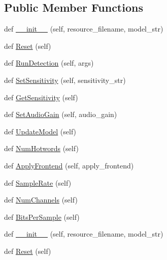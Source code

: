 \subsection*{Public Member Functions}
\begin{DoxyCompactItemize}
\item 
def \hyperlink{classsnowboydetect_1_1SnowboyDetect_aacebc037562e278d600502c85a6e6240}{\+\_\+\+\_\+init\+\_\+\+\_\+} (self, resource\+\_\+filename, model\+\_\+str)
\item 
def \hyperlink{classsnowboydetect_1_1SnowboyDetect_a721badd1050cbad9ecb3734610f5fec7}{Reset} (self)
\item 
def \hyperlink{classsnowboydetect_1_1SnowboyDetect_aa81c3446d9f86cdc82afe896b7503f92}{Run\+Detection} (self, args)
\item 
def \hyperlink{classsnowboydetect_1_1SnowboyDetect_a31672fe0859a72050c7e143c58c218c7}{Set\+Sensitivity} (self, sensitivity\+\_\+str)
\item 
def \hyperlink{classsnowboydetect_1_1SnowboyDetect_a836549077589837b8e94f563f3f9ff03}{Get\+Sensitivity} (self)
\item 
def \hyperlink{classsnowboydetect_1_1SnowboyDetect_acfa7c3d929aa0a1400a85f4c85883830}{Set\+Audio\+Gain} (self, audio\+\_\+gain)
\item 
def \hyperlink{classsnowboydetect_1_1SnowboyDetect_a5fe893dcbae408d4419b33b8f1c7db5a}{Update\+Model} (self)
\item 
def \hyperlink{classsnowboydetect_1_1SnowboyDetect_a281b6281e98d035872f289a4d31041dd}{Num\+Hotwords} (self)
\item 
def \hyperlink{classsnowboydetect_1_1SnowboyDetect_a4b4e6740fe532680390a8dcf3501a64a}{Apply\+Frontend} (self, apply\+\_\+frontend)
\item 
def \hyperlink{classsnowboydetect_1_1SnowboyDetect_aa4a6097517da1f8ba4fab8041e0748b8}{Sample\+Rate} (self)
\item 
def \hyperlink{classsnowboydetect_1_1SnowboyDetect_a46d9f2d6be050a727731557d7865ec96}{Num\+Channels} (self)
\item 
def \hyperlink{classsnowboydetect_1_1SnowboyDetect_a0281b47c8358e32c8aa464213b0dba97}{Bits\+Per\+Sample} (self)
\item 
def \hyperlink{classsnowboydetect_1_1SnowboyDetect_aacebc037562e278d600502c85a6e6240}{\+\_\+\+\_\+init\+\_\+\+\_\+} (self, resource\+\_\+filename, model\+\_\+str)
\item 
def \hyperlink{classsnowboydetect_1_1SnowboyDetect_a721badd1050cbad9ecb3734610f5fec7}{Reset} (self)

\end{DoxyCompactItemize}
